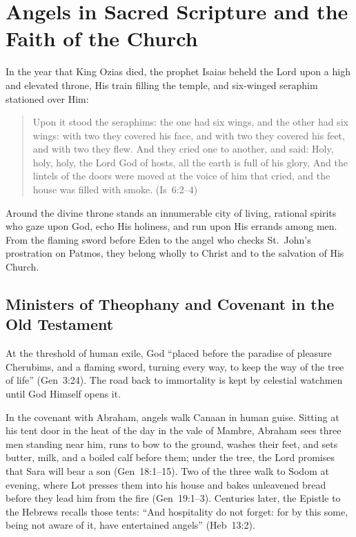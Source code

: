 \section{Angels in Sacred Scripture and the Faith of the Church}
\label{sec:scripture-and-faith}

In the year that King Ozias died, the prophet Isaias beheld the Lord upon a high and elevated throne, His train filling the temple, and six-winged seraphim stationed over Him:
\begin{quotation}
Upon it stood the seraphims: the one had six wings, and the other had six wings: with two they covered his face, and with two they covered his feet, and with two they flew. And they cried one to another, and said: Holy, holy, holy, the Lord God of hosts, all the earth is full of his glory, And the lintels of the doors were moved at the voice of him that cried, and the house was filled with smoke. (Is~6:2--4)
\end{quotation}
Around the divine throne stands an innumerable city of living, rational spirits who gaze upon God, echo His holiness, and run upon His errands among men. From the flaming sword before Eden to the angel who checks St.~John's prostration on Patmos, they belong wholly to Christ and to the salvation of His Church.

\subsection{Ministers of Theophany and Covenant in the Old Testament}
\label{subsec:ot-theophany}

At the threshold of human exile, God ``placed before the paradise of pleasure Cherubims, and a flaming sword, turning every way, to keep the way of the tree of life'' (Gen~3:24). The road back to immortality is kept by celestial watchmen until God Himself opens it.

In the covenant with Abraham, angels walk Canaan in human guise. Sitting at his tent door in the heat of the day in the vale of Mambre, Abraham sees three men standing near him, runs to bow to the ground, washes their feet, and sets butter, milk, and a boiled calf before them; under the tree, the Lord promises that Sara will bear a son (Gen~18:1--15). Two of the three walk to Sodom at evening, where Lot presses them into his house and bakes unleavened bread before they lead him from the fire (Gen~19:1--3). Centuries later, the Epistle to the Hebrews recalls those tents: ``And hospitality do not forget: for by this some, being not aware of it, have entertained angels'' (Heb~13:2).

